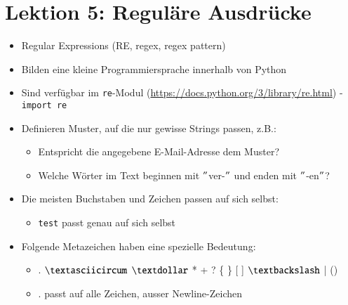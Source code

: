 \part*{Lektion 5: Reguläre Ausdrücke}
\begin{itemize}
	\item Regular Expressions (RE, regex, regex pattern)
	\item Bilden eine kleine Programmiersprache innerhalb von Python
	\item Sind verfügbar im \texttt{re}-Modul (\url{https://docs.python.org/3/library/re.html}) - \texttt{import re}
	\item Definieren Muster, auf die nur gewisse Strings passen, z.B.:
	\begin{itemize}
		\item Entspricht die angegebene E-Mail-Adresse dem Muster?
		\item Welche Wörter im Text beginnen mit $"$ver-$"$ und enden mit $"$-en$"$?
	\end{itemize}
	\item Die meisten Buchstaben und Zeichen passen auf sich selbst:
	\begin{itemize}
		\item \texttt{test} passt genau auf sich selbst
	\end{itemize}
	\item Folgende Metazeichen haben eine spezielle Bedeutung:
	\begin{itemize}
		\item[\-] . $\textasciicircum$ $\textdollar$ * + ? \{ \} [ ] $\textbackslash$ | ()
		\item[\-] . passt auf alle Zeichen, ausser Newline-Zeichen
	\end{itemize}
\end{itemize}

